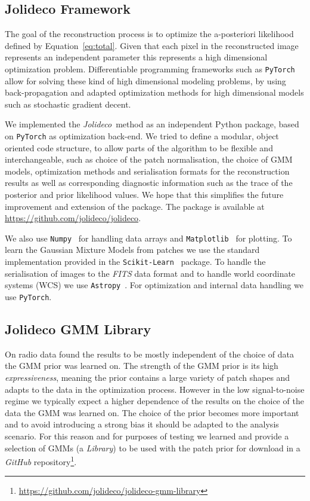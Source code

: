 \documentclass[twocolumn]{aastex631}
\newcommand{\jolideco}{\textit{Jolideco}~}
\begin{document}
    \subsection{Jolideco Framework}
    The goal of the reconstruction process is to optimize the a-posteriori likelihood defined by Equation~\ref{eq:total}. Given that each pixel in the reconstructed image represents an independent parameter this represents a high dimensional optimization problem. Differentiable programming frameworks such as \texttt{PyTorch}~\citep{Pytorch2019} allow for solving these kind of high dimensional modeling problems, by using back-propagation and adapted optimization methods for high dimensional models such as stochastic gradient decent.

    We implemented the \jolideco method as an independent Python package, based on \texttt{PyTorch} as optimization back-end. We tried to define a modular, object oriented code structure, to allow parts of the algorithm to be flexible and interchangeable, such as choice of the patch normalisation, the choice of GMM models, optimization methods and serialisation formats for the reconstruction results as well as corresponding diagnostic information such as the trace of the posterior and prior likelihood values. We hope that this simplifies the future improvement and extension of the package. The package is available at \url{https://github.com/jolideco/jolideco}.

    We also use \texttt{Numpy}~\citep{Numpy2020} for handling data arrays and \texttt{Matplotlib}~\citep{Hunter2007} for plotting. To learn the Gaussian Mixture Models from patches we use the standard implementation provided in the \texttt{Scikit-Learn}~\citep{Skimage2014} package. To handle the serialisation of images to the \textit{FITS} data format and to handle world coordinate systems (WCS) we use \texttt{Astropy}~\citep{Astropy2018}. For optimization and internal data handling we use \texttt{PyTorch}.

    \subsection{Jolideco GMM Library}
    \label{ssec:jolideco-gmm-library}
    On radio data \cite{Bouman2016} found the results to be mostly independent of the choice of data the GMM prior was learned on. The strength of the GMM prior is its high \textit{expressiveness}, meaning the prior contains a large variety of patch shapes and adapts to the data in the optimization process. However in the low signal-to-noise regime we typically expect a higher dependence of the results on the choice of the data the GMM was learned on. The choice of the prior becomes more important and to avoid introducing a strong bias it should be adapted to the analysis scenario. For this reason and for purposes of testing we learned and provide a selection of GMMs (a \textit{Library}) to be used with the patch prior for download in a \textit{GitHub} repository\footnote{\url{https://github.com/jolideco/jolideco-gmm-library}}.
    
\end{document}
